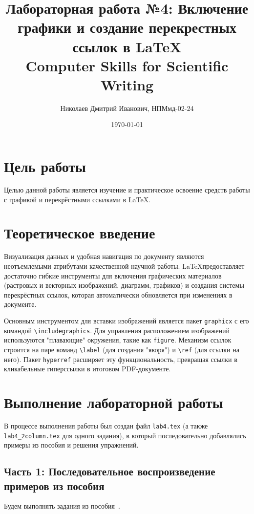 \documentclass[a4paper, 12pt]{article}
\author{Николаев Дмитрий Иванович, НПМмд-02-24}
\title{Лабораторная работа №4: Включение графики и создание перекрестных ссылок в \LaTeX \\ Computer Skills for Scientific Writing}
\date{\today}
\begin{document}
  \maketitle
  \tableofcontents
  \pagebreak

  \listoffigures
  \lstlistoflistings
  \pagebreak

\section{Цель работы}
Целью данной работы является изучение и практическое освоение средств работы с графикой и перекрёстными ссылками в \LaTeX. 

\section{Теоретическое введение}
Визуализация данных и удобная навигация по документу являются неотъемлемыми атрибутами качественной научной работы. \LaTeX предоставляет достаточно гибкие инструменты для включения графических материалов (растровых и векторных изображений, диаграмм, графиков) и создания системы перекрёстных ссылок, которая автоматически обновляется при изменениях в документе.

Основным инструментом для вставки изображений является пакет \texttt{graphicx} с его командой \texttt{\textbackslash includegraphics}. Для управления расположением изображений используются "плавающие" окружения, такие как \texttt{figure}. Механизм ссылок строится на паре команд \texttt{\textbackslash label} (для создания "якоря") и \texttt{\textbackslash ref} (для ссылки на него). Пакет \texttt{hyperref} расширяет эту функциональность, превращая ссылки в кликабельные гиперссылки в итоговом PDF-документе.

\section{Выполнение лабораторной работы}
В процессе выполнения работы был создан файл \texttt{lab4.tex} (а также \texttt{lab4\_2column.tex} для одного задания), в который последовательно добавлялись примеры из пособия и решения упражнений.

\subsection{Часть 1: Последовательное воспроизведение примеров из пособия}

Будем выполнять задания из пособия~\cite{lab}.
\end{document}
